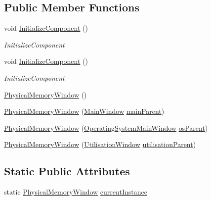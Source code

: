 \subsection*{Public Member Functions}
\begin{DoxyCompactItemize}
\item 
void \hyperlink{class_c_p_u___o_s___simulator_1_1_physical_memory_window_ae7b78ce6936a5629d90c6959da4c4855}{Initialize\+Component} ()
\begin{DoxyCompactList}\small\item\em Initialize\+Component \end{DoxyCompactList}\item 
void \hyperlink{class_c_p_u___o_s___simulator_1_1_physical_memory_window_ae7b78ce6936a5629d90c6959da4c4855}{Initialize\+Component} ()
\begin{DoxyCompactList}\small\item\em Initialize\+Component \end{DoxyCompactList}\item 
\hyperlink{class_c_p_u___o_s___simulator_1_1_physical_memory_window_a5de10e22a669f4878daa665cdd852c98}{Physical\+Memory\+Window} ()
\item 
\hyperlink{class_c_p_u___o_s___simulator_1_1_physical_memory_window_abfce3dcc377f830bf80ce6a473c451ae}{Physical\+Memory\+Window} (\hyperlink{class_c_p_u___o_s___simulator_1_1_main_window}{Main\+Window} \hyperlink{class_c_p_u___o_s___simulator_1_1_physical_memory_window_a72efc6f331f6236abaaa103dd2430d6d}{main\+Parent})
\item 
\hyperlink{class_c_p_u___o_s___simulator_1_1_physical_memory_window_a7a0f07c83c98f10bd558203687e220eb}{Physical\+Memory\+Window} (\hyperlink{class_c_p_u___o_s___simulator_1_1_operating_system_main_window}{Operating\+System\+Main\+Window} \hyperlink{class_c_p_u___o_s___simulator_1_1_physical_memory_window_aa188424c9a32a838fc49c5411e3ebc99}{os\+Parent})
\item 
\hyperlink{class_c_p_u___o_s___simulator_1_1_physical_memory_window_a652fb3a3d12116dcbdb0d6b0055d32af}{Physical\+Memory\+Window} (\hyperlink{class_c_p_u___o_s___simulator_1_1_utilisation_window}{Utilisation\+Window} \hyperlink{class_c_p_u___o_s___simulator_1_1_physical_memory_window_a314b7959882d19b7ae5dd2a27cd38307}{utilisation\+Parent})
\end{DoxyCompactItemize}
\subsection*{Static Public Attributes}
\begin{DoxyCompactItemize}
\item 
static \hyperlink{class_c_p_u___o_s___simulator_1_1_physical_memory_window}{Physical\+Memory\+Window} \hyperlink{class_c_p_u___o_s___simulator_1_1_physical_memory_window_a5baebf9b07c700f57ea5e6c6ec96e7c5}{current\+Instance}
\end{DoxyCompactItemize}
